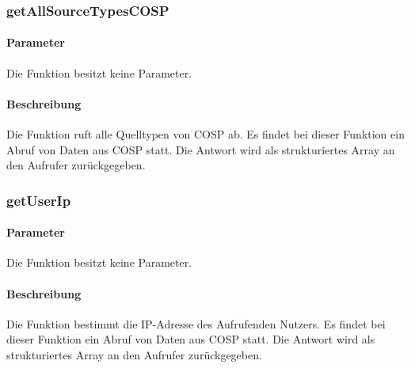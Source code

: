 \subsubsection{getAllSourceTypesCOSP}
\paragraph{Parameter} Die Funktion besitzt keine Parameter.
\paragraph{Beschreibung} Die Funktion ruft alle Quelltypen von COSP ab. Es findet bei dieser Funktion ein Abruf von Daten aus {\glqq COSP\grqq} statt. Die Antwort wird als strukturiertes Array an den Aufrufer zurückgegeben.
\subsubsection{getUserIp}
\paragraph{Parameter} Die Funktion besitzt keine Parameter.
\paragraph{Beschreibung} Die Funktion bestimmt die IP-Adresse des Aufrufenden Nutzers. Es findet bei dieser Funktion ein Abruf von Daten aus {\glqq COSP\grqq} statt. Die Antwort wird als strukturiertes Array an den Aufrufer zurückgegeben.